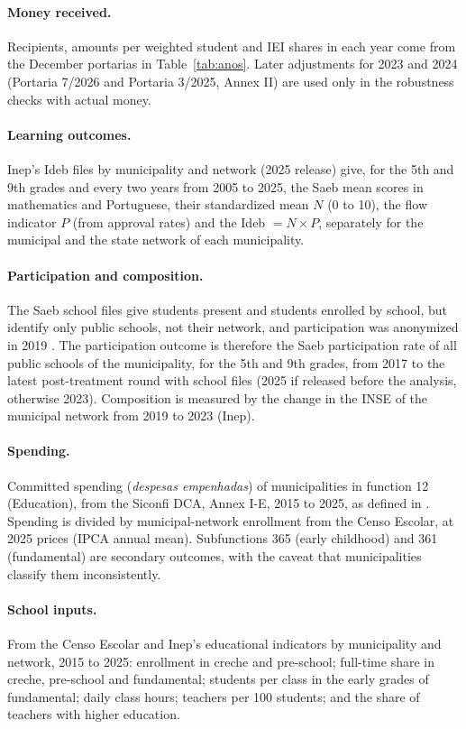\documentclass[11pt]{article}
\begin{document}
\paragraph{Money received.} Recipients, amounts per weighted student and IEI shares in each year come from the December portarias in Table~\ref{tab:anos}. Later adjustments for 2023 and 2024 (Portaria 7/2026 and Portaria 3/2025, Annex II) are used only in the robustness checks with actual money.

\paragraph{Learning outcomes.} Inep's Ideb files by municipality and network (2025 release) give, for the 5th and 9th grades and every two years from 2005 to 2025, the Saeb mean scores in mathematics and Portuguese, their standardized mean $N$ (0 to 10), the flow indicator $P$ (from approval rates) and the Ideb $= N \times P$, separately for the municipal and the state network of each municipality.

\paragraph{Participation and composition.} The Saeb school files give students present and students enrolled by school, but identify only public schools, not their network, and participation was anonymized in 2019 \citep{lima2025ideb}. The participation outcome is therefore the Saeb participation rate of all public schools of the municipality, for the 5th and 9th grades, from 2017 to the latest post-treatment round with school files (2025 if released before the analysis, otherwise 2023). Composition is measured by the change in the INSE of the municipal network from 2019 to 2023 (Inep).

\paragraph{Spending.} Committed spending (\textit{despesas empenhadas}) of municipalities in function 12 (Education), from the Siconfi DCA, Annex I-E, 2015 to 2025, as defined in \citet{cunha2026}. Spending is divided by municipal-network enrollment from the Censo Escolar, at 2025 prices (IPCA annual mean). Subfunctions 365 (early childhood) and 361 (fundamental) are secondary outcomes, with the caveat that municipalities classify them inconsistently.

\paragraph{School inputs.} From the Censo Escolar and Inep's educational indicators by municipality and network, 2015 to 2025: enrollment in creche and pre-school; full-time share in creche, pre-school and fundamental; students per class in the early grades of fundamental; daily class hours; teachers per 100 students; and the share of teachers with higher education.
\end{document}
